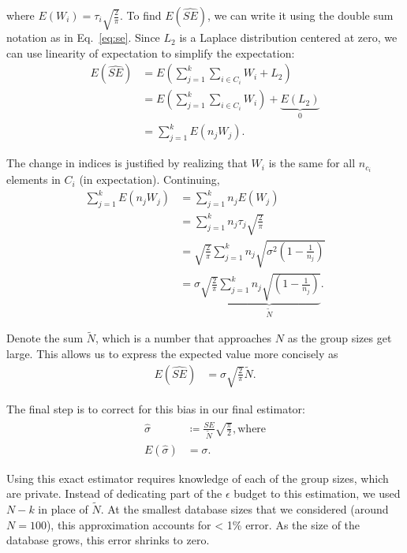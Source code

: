\noindent where $E(W_i) = \tau_i \sqrt{\frac{2}{\pi}}$.  To find $E(\widehat{SE})$, we can write it using the double sum notation as in Eq.~\eqref{eq:se}. Since $L_2$ is a Laplace distribution centered at zero, we can use linearity of expectation to simplify the expectation:
\begin{align*}
E(\widehat{SE}) &= E\left(\sum_{j=1}^k \sum_{i \in C_i} W_i + L_2 \right)\\
&= E\left(\sum_{j=1}^k \sum_{i \in C_i} W_i \right) + 
\underbrace{E(L_2)}_{0}\\
&= \sum_{j=1}^k E\left(n_j W_j \right).
\end{align*}

\noindent The change in indices is justified by realizing that $W_i$ is the same for all $n_{c_i}$ elements in $C_i$ (in expectation). Continuing,
\begin{align*}
\sum_{j=1}^k E\left(n_j W_j \right) &= \sum_{j=1}^k n_j E\left(W_j \right) \\
&= \sum_{j=1}^k n_j \tau_j \sqrt{\frac{2}{\pi}} \\
&= \sqrt{\frac{2}{\pi}} \sum_{j=1}^k n_j \sqrt{\sigma^2\left(1 - \frac{1}{n_j}\right)}  \\
&= \sigma \sqrt{\frac{2}{\pi}} \underbrace{\sum_{j=1}^k n_j \sqrt{\left(1 - \frac{1}{n_j}\right)}}_{\tilde{N}}.
\end{align*}

\noindent Denote the sum $\tilde{N}$, which is a number that approaches $N$ as the group sizes get large. This allows us to express the expected value more concisely as
\begin{align*}
E(\widehat{SE}) &= \sigma \sqrt{\frac{2}{\pi}} \tilde{N}.
\end{align*}

The final step is to correct for this bias in our final estimator:
\begin{align*}
\hat{\sigma} &\coloneqq \frac{\widehat{SE}}{\tilde{N}}\sqrt{\frac{\pi}{2}}, \text{where}\\
E\left(\hat{\sigma}\right) &= \sigma.
\end{align*}

\noindent Using this exact estimator requires knowledge of each of the group sizes, which are private. Instead of dedicating part of the $\epsilon$ budget to this estimation, we used $N - k$ in place of $\tilde{N}$. At the smallest database sizes that we considered (around $N = 100$), this approximation accounts for < 1\% error. As the size of the database grows, this error shrinks to zero.

